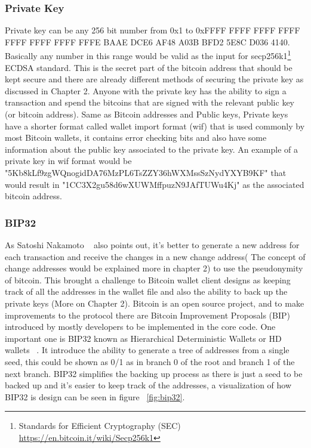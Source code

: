 \subsubsection{Private Key}
Private key can be any 256 bit number from 0x1 to 0xFFFF FFFF FFFF FFFF FFFF FFFF FFFF FFFE BAAE DCE6 AF48 A03B BFD2 5E8C D036 4140. Basically any number in this range would be valid as the input for secp256k1\footnote{Standards for Efficient Cryptography (SEC) \url{https://en.bitcoin.it/wiki/Secp256k1}} ECDSA standard. This is the secret part of the bitcoin address that should be kept secure and there are already different methods of securing the private key as discussed in Chapter 2. Anyone with the private key has the ability to sign a transaction and spend the bitcoins that are signed with the relevant public key (or bitcoin address). 
Same as Bitcoin addresses and Public keys, Private keys have a shorter format called wallet import format (wif) that is used commonly by most Bitcoin wallets, it contains error checking bits and also have some information about the public key associated to the private key. An example of a private key in wif format would be "5Kb8kLf9zgWQnogidDA76MzPL6TsZZY36hWXMssSzNydYXYB9KF" that would result in "1CC3X2gu58d6wXUWMffpuzN9JAfTUWu4Kj" as the associated bitcoin address.



\subsubsection{BIP32}
As Satoshi Nakamoto ~\cite{Nak08} also points out, it's better to generate a new address for each transaction and receive the changes in a new change address( The concept of change addresses would be explained more in chapter 2) to use the pseudonymity of bitcoin. This brought a challenge to Bitcoin wallet client designs as keeping track of all the addresses in the wallet file and also the ability to back up the private keys (More on Chapter 2). 
Bitcoin is an open source project, and to make improvements to the protocol there are Bitcoin Improvement Proposals (BIP) introduced by mostly developers to be implemented in the core code. One important one is BIP32 known as Hierarchical Deterministic Wallets or HD wallets ~. It introduce the ability to generate a tree of addresses from a single seed, this could be shown as 0/1 as in branch 0 of the root and branch 1 of the next branch. BIP32 simplifies the backing up process as there is just a seed to be backed up and it's easier to keep track of the addresses, a visualization of how BIP32 is design can be seen in figure ~\ref{fig:bip32}.

